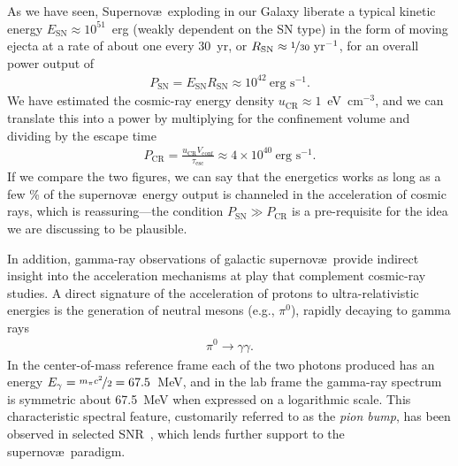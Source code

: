 As we have seen, Supernov\ae\ exploding in our Galaxy liberate a typical kinetic
energy $E_\text{SN} \approx 10^{51}$~erg (weakly dependent on the SN type) in the
form of moving ejecta at a rate of about one every 30~yr, or
$R_\text{SN} \approx \nicefrac{1}{30}~\text{yr}^{-1}$, for an overall power output of
\begin{align*}
  P_\text{SN} = E_\text{SN} R_\text{SN} \approx 10^{42}~\text{erg~s}^{-1}.
\end{align*}
We have estimated the cosmic-ray energy density $u_\text{CR} \approx 1$~eV~cm$^{-3}$,
and we can translate this into a power by multiplying for the confinement
volume 
and dividing by the escape time
\begin{align*}
  P_\text{CR} = \frac{u_\text{CR} V_\text{conf}}{\tau_\text{esc}}
  \approx 4 \times 10^{40}~\text{erg~s}^{-1}.
\end{align*}
If we compare the two figures, we can say that the energetics works as long as
a few \% of the supernov\ae~energy output is channeled in the acceleration of
cosmic rays, which is reassuring---the condition $P_\text{SN} \gg P_\text{CR}$ is
a pre-requisite for the idea we are discussing to be plausible.

In addition, gamma-ray observations of galactic supernov\ae\ provide indirect insight
into the acceleration mechanisms at play that complement cosmic-ray studies.
A direct signature of the acceleration of protons to ultra-relativistic energies
is the generation of neutral mesons (e.g., $\pi^0$), rapidly decaying to gamma rays
\begin{align*}
  \pi^0 \rightarrow \gamma \gamma.
\end{align*}
In the center-of-mass reference frame each of the two photons produced has an
energy $E_\gamma = \nicefrac{m_\pi c^2}{2} = 67.5$~MeV, and in the lab frame the
gamma-ray spectrum is symmetric about 67.5~MeV when expressed on a logarithmic
scale. This characteristic spectral feature, customarily referred to as the
\emph{pion bump}, has been observed in selected SNR~\cite{2013Sci...339..807A},
which lends further support to the supernov\ae~paradigm.



